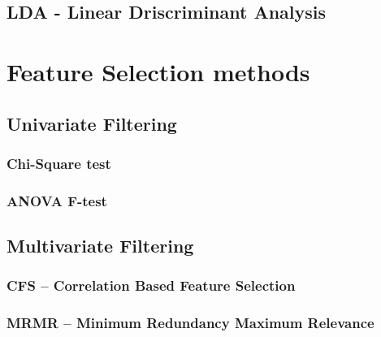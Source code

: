 \subsection{LDA - Linear Driscriminant Analysis} %
\label{sec:lda}

\section{Feature Selection methods} %
\label{sec:feature_extraction}


\subsection{Univariate Filtering} %
\label{sec:inserting_tables}

\subsubsection{Chi-Square test} %
\label{sec:inserting_tables}

\subsubsection{ANOVA F-test} %
\label{sec:inserting_tables}

\subsection{Multivariate Filtering} %
\label{sec:inserting_tables}

\subsubsection{CFS – Correlation Based Feature Selection} %
\label{sec:inserting_tables}

\subsubsection{MRMR – Minimum Redundancy Maximum Relevance} %
\label{sec:inserting_tables}